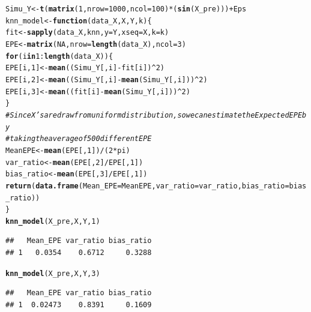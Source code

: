 \documentclass{article}\usepackage[]{graphicx}\usepackage[]{color}
\makeatletter
\newcommand{\hlnum}[1]{\textcolor[rgb]{0.686,0.059,0.569}{#1}}%
\newcommand{\hlcom}[1]{\textcolor[rgb]{0.678,0.584,0.686}{\textit{#1}}}%
\newcommand{\hlopt}[1]{\textcolor[rgb]{0,0,0}{#1}}%
\newcommand{\hlstd}[1]{\textcolor[rgb]{0.345,0.345,0.345}{#1}}%
\newcommand{\hlkwa}[1]{\textcolor[rgb]{0.161,0.373,0.58}{\textbf{#1}}}%
\newcommand{\hlkwb}[1]{\textcolor[rgb]{0.69,0.353,0.396}{#1}}%
\newcommand{\hlkwc}[1]{\textcolor[rgb]{0.333,0.667,0.333}{#1}}%
\newcommand{\hlkwd}[1]{\textcolor[rgb]{0.737,0.353,0.396}{\textbf{#1}}}%
\newenvironment{kframe}{%
 \def\at@end@of@kframe{}%
 \ifinner\ifhmode%
  \def\at@end@of@kframe{\end{minipage}}%
  \begin{minipage}{\columnwidth}%
 \fi\fi%
 \def\FrameCommand##1{\hskip\@totalleftmargin \hskip-\fboxsep
 \colorbox{shadecolor}{##1}\hskip-\fboxsep
     \hskip-\linewidth \hskip-\@totalleftmargin \hskip\columnwidth}%
 \MakeFramed {\advance\hsize-\width
   \@totalleftmargin\z@ \linewidth\hsize
   \@setminipage}}%
 {\par\unskip\endMakeFramed%
 \at@end@of@kframe}
\newenvironment{knitrout}{}{} %
\makeatother
\begin{document}
\begin{knitrout}
\begin{kframe}
\begin{alltt}
\hlstd{Simu_Y} \hlkwb{<-} \hlkwd{t}\hlstd{(}\hlkwd{matrix}\hlstd{(}\hlnum{1}\hlstd{,} \hlkwc{nrow} \hlstd{=} \hlnum{1000}\hlstd{,} \hlkwc{ncol} \hlstd{=} \hlnum{100}\hlstd{)} \hlopt{*} \hlstd{(}\hlkwd{sin}\hlstd{(X_pre)))} \hlopt{+} \hlstd{Eps}
\hlstd{knn_model} \hlkwb{<-} \hlkwa{function}\hlstd{(}\hlkwc{data_X}\hlstd{,} \hlkwc{X}\hlstd{,} \hlkwc{Y}\hlstd{,} \hlkwc{k}\hlstd{) \{}
    \hlstd{fit} \hlkwb{<-} \hlkwd{sapply}\hlstd{(data_X, knn,} \hlkwc{y} \hlstd{= Y,} \hlkwc{xseq} \hlstd{= X,} \hlkwc{k} \hlstd{= k)}
    \hlstd{EPE} \hlkwb{<-} \hlkwd{matrix}\hlstd{(}\hlnum{NA}\hlstd{,} \hlkwc{nrow} \hlstd{=} \hlkwd{length}\hlstd{(data_X),} \hlkwc{ncol} \hlstd{=} \hlnum{3}\hlstd{)}
    \hlkwa{for} \hlstd{(i} \hlkwa{in} \hlnum{1}\hlopt{:}\hlkwd{length}\hlstd{(data_X)) \{}
        \hlstd{EPE[i,} \hlnum{1}\hlstd{]} \hlkwb{<-} \hlkwd{mean}\hlstd{((Simu_Y[, i]} \hlopt{-} \hlstd{fit[i])}\hlopt{^}\hlnum{2}\hlstd{)}
        \hlstd{EPE[i,} \hlnum{2}\hlstd{]} \hlkwb{<-} \hlkwd{mean}\hlstd{((Simu_Y[, i]} \hlopt{-} \hlkwd{mean}\hlstd{(Simu_Y[, i]))}\hlopt{^}\hlnum{2}\hlstd{)}
        \hlstd{EPE[i,} \hlnum{3}\hlstd{]} \hlkwb{<-} \hlkwd{mean}\hlstd{((fit[i]} \hlopt{-} \hlkwd{mean}\hlstd{(Simu_Y[, i]))}\hlopt{^}\hlnum{2}\hlstd{)}
    \hlstd{\}}
    \hlcom{# Since X's are draw from uniform distribution, so we can estimate the Expected EPE by}
    \hlcom{# taking the average of 500 different EPE}
    \hlstd{MeanEPE} \hlkwb{<-} \hlkwd{mean}\hlstd{(EPE[,} \hlnum{1}\hlstd{])}\hlopt{/}\hlstd{(}\hlnum{2} \hlopt{*} \hlstd{pi)}
    \hlstd{var_ratio} \hlkwb{<-} \hlkwd{mean}\hlstd{(EPE[,} \hlnum{2}\hlstd{]}\hlopt{/}\hlstd{EPE[,} \hlnum{1}\hlstd{])}
    \hlstd{bias_ratio} \hlkwb{<-} \hlkwd{mean}\hlstd{(EPE[,} \hlnum{3}\hlstd{]}\hlopt{/}\hlstd{EPE[,} \hlnum{1}\hlstd{])}
    \hlkwd{return}\hlstd{(}\hlkwd{data.frame}\hlstd{(}\hlkwc{Mean_EPE} \hlstd{= MeanEPE,} \hlkwc{var_ratio} \hlstd{= var_ratio,} \hlkwc{bias_ratio} \hlstd{= bias_ratio))}
\hlstd{\}}
\hlkwd{knn_model}\hlstd{(X_pre, X, Y,} \hlnum{1}\hlstd{)}
\end{alltt}
\begin{verbatim}
##   Mean_EPE var_ratio bias_ratio
## 1   0.0354    0.6712     0.3288
\end{verbatim}
\begin{alltt}
\hlkwd{knn_model}\hlstd{(X_pre, X, Y,} \hlnum{3}\hlstd{)}
\end{alltt}
\begin{verbatim}
##   Mean_EPE var_ratio bias_ratio
## 1  0.02473    0.8391     0.1609
\end{verbatim}
\begin{alltt}

\end{alltt}
\end{kframe}
\end{knitrout}
\end{document}
